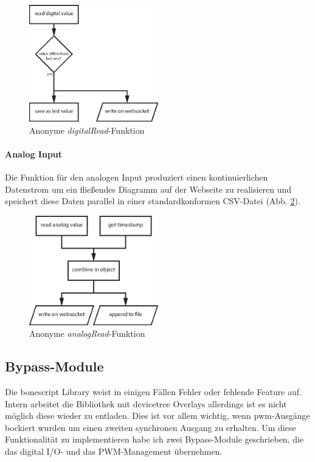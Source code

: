 \begin{figure}[H]
  \centering
  \includegraphics[width = 0.5\textwidth]{dokumentation/images/wssTimerDigital.eps}
  \caption{Anonyme \textit{digitalRead}-Funktion}
  \label{fig:wssTimerDigital}
\end{figure}

\paragraph{Analog Input} Die Funktion für den analogen Input produziert einen kontinuierlichen Datenstrom um ein fließendes Diagramm auf der Webseite zu realisieren und speichert diese Daten parallel in einer standardkonformen CSV-Datei \cite{rfc4180} (Abb. \ref{fig:wssTimerAnalog}).

\begin{figure}[H]
  \centering
  \includegraphics[width = 0.5\textwidth]{dokumentation/images/wssTimerAnalog.eps}
  \caption{Anonyme \textit{analogRead}-Funktion}
  \label{fig:wssTimerAnalog}
\end{figure}

\subsection{Bypass-Module}
Die bonescript Library weist in einigen Fällen Fehler oder fehlende Feature auf. Intern arbeitet die Bibliothek mit \gls{devicetree} Overlays allerdings ist es nicht möglich diese wieder zu entladen. Dies ist vor allem wichtig, wenn \gls{pwm}-Ausgänge bockiert wurden um einen zweiten synchronen Ausgang zu erhalten. Um diese Funktionalität zu implementieren habe ich zwei Bypass-Module geschrieben, die das digital I/O- und das PWM-Management übernehmen.

